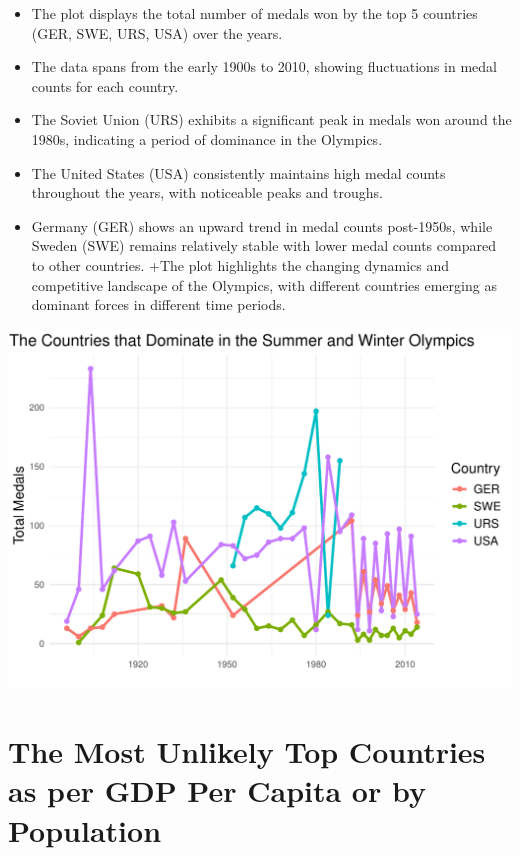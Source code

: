 \documentclass[12pt,preprint, authoryear]{elsarticle}
\let\origfigure\figure
\let\endorigfigure\endfigure
\renewenvironment{figure}[1][2] {
    \expandafter\origfigure\expandafter[H]
} {
    \endorigfigure
}
\numberwithin{equation}{section}
\numberwithin{figure}{section}
\numberwithin{table}{section}
\def\tightlist{} %
\begin{document}
\begin{itemize}
\tightlist
\item
  The plot displays the total number of medals won by the top 5
  countries (GER, SWE, URS, USA) over the years.
\item
  The data spans from the early 1900s to 2010, showing fluctuations in
  medal counts for each country.
\item
  The Soviet Union (URS) exhibits a significant peak in medals won
  around the 1980s, indicating a period of dominance in the Olympics.
\item
  The United States (USA) consistently maintains high medal counts
  throughout the years, with noticeable peaks and troughs.
\item
  Germany (GER) shows an upward trend in medal counts post-1950s, while
  Sweden (SWE) remains relatively stable with lower medal counts
  compared to other countries. +The plot highlights the changing
  dynamics and competitive landscape of the Olympics, with different
  countries emerging as dominant forces in different time periods.
\end{itemize}

\begin{figure}

{\centering \includegraphics{README_files/figure-latex/unnamed-chunk-1-1} 

}

\caption{The Top Countries that Dominate in both the Summer and Winter Olympics\label{Figure1}}\label{fig:unnamed-chunk-1}
\end{figure}

\hypertarget{the-most-unlikely-top-countries-as-per-gdp-per-capita-or-by-population}{%
\section{The Most Unlikely Top Countries as per GDP Per Capita or by
Population}\label{the-most-unlikely-top-countries-as-per-gdp-per-capita-or-by-population}}
\end{document}
